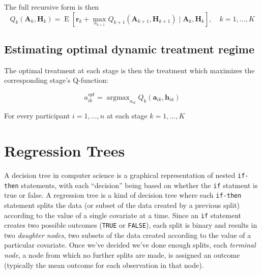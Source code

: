 \documentclass[12pt]{article}
\DeclareMathOperator*{\argmax}{argmax}
\begin{document}
The full recursive form is then 
  \begin{equation}
     Q_{k}(\bm{A}_{k}, \bm{H}_{k})  = \operatorname{E}[\bm{r}_{k} + \max_{a_{k+1}} Q_{k+1}(\bm{A}_{k+1}, \bm{H}_{k+1}) \mid \bm{A}_{k}, \bm{H}_{k}], \quad k = 1, \ldots, K
  \end{equation}



\subsection{Estimating optimal dynamic treatment regime} %
\label{sub:estimating_optimal_dynamic_treatment_regime}

The optimal treatment at each stage is then the treatment which maximizes the corresponding stage's Q-function:

\[
  a^{opt}_{ik} = \argmax_{a_{ik}} Q_{k}(\bm{a}_{ik}, \bm{h}_{ik})
\]

For every participant $i = 1, \ldots, n$ at each stage $k = 1, \ldots, K$






\section{Regression Trees} %
\label{sec:rpart}

A decision tree in computer science is a graphical representation of nested \texttt{if-then} statements, with each ``decision'' being based on whether the \texttt{if} statment is true or false. A regression tree is a kind of decision tree where each \texttt{if-then} statement splits the data (or subset of the data created by a previous split) according to the value of a single covariate at a time. Since an \texttt{if} statement creates two possible outcomes (\texttt{TRUE} or \texttt{FALSE}), each split is binary and results in two \emph{daughter nodes}, two subsets of the data created according to the value of a particular covariate. Once we've decided we've done enough splits, each \emph{terminal node}, a node from which no further splits are made, is assigned an outcome (typically the mean outcome for each observation in that node).
\end{document}
